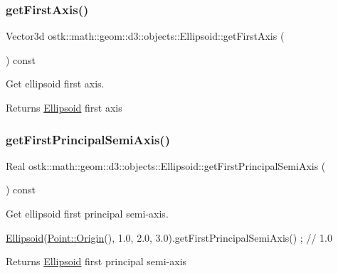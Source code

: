 \subsubsection{\texorpdfstring{get\+First\+Axis()}{getFirstAxis()}}
{\footnotesize\ttfamily Vector3d ostk\+::math\+::geom\+::d3\+::objects\+::\+Ellipsoid\+::get\+First\+Axis (\begin{DoxyParamCaption}{ }\end{DoxyParamCaption}) const}



Get ellipsoid first axis. 

\begin{DoxyReturn}{Returns}
\hyperlink{classostk_1_1math_1_1geom_1_1d3_1_1objects_1_1_ellipsoid}{Ellipsoid} first axis 
\end{DoxyReturn}
\mbox{\label{classostk_1_1math_1_1geom_1_1d3_1_1objects_1_1_ellipsoid_a0d922209dffb806def71604d7dde2ba7}} 
\subsubsection{\texorpdfstring{get\+First\+Principal\+Semi\+Axis()}{getFirstPrincipalSemiAxis()}}
{\footnotesize\ttfamily Real ostk\+::math\+::geom\+::d3\+::objects\+::\+Ellipsoid\+::get\+First\+Principal\+Semi\+Axis (\begin{DoxyParamCaption}{ }\end{DoxyParamCaption}) const}



Get ellipsoid first principal semi-\/axis. 


\begin{DoxyCode}
\hyperlink{classostk_1_1math_1_1geom_1_1d3_1_1objects_1_1_ellipsoid_a106c71abf9503f3d06b2613c1c7e9d65}{Ellipsoid}(\hyperlink{classostk_1_1math_1_1geom_1_1d3_1_1objects_1_1_point_a079c199f08b015d456d02728a71b534c}{Point::Origin}(), 1.0, 2.0, 3.0).getFirstPrincipalSemiAxis() ; \textcolor{comment}{// 1.0}
\end{DoxyCode}


\begin{DoxyReturn}{Returns}
\hyperlink{classostk_1_1math_1_1geom_1_1d3_1_1objects_1_1_ellipsoid}{Ellipsoid} first principal semi-\/axis 
\end{DoxyReturn}
\mbox{\label{classostk_1_1math_1_1geom_1_1d3_1_1objects_1_1_ellipsoid_aea24d2d268d701c31a18f2ddac2cd394}} 
